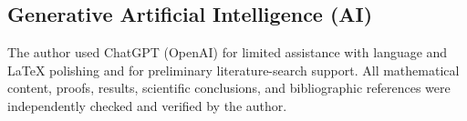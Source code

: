 \documentclass{amsart}
\theoremstyle{definition}
\theoremstyle{remark}
\newcommand{\0}{\boldsymbol{0}}
\begin{document}
\subsection{Generative Artificial Intelligence (AI)}
The author used ChatGPT (OpenAI) for limited assistance with language and LaTeX polishing and for preliminary literature-search support. All mathematical content, proofs, results, scientific conclusions, and bibliographic references were independently checked and verified by the author.





\end{document}
